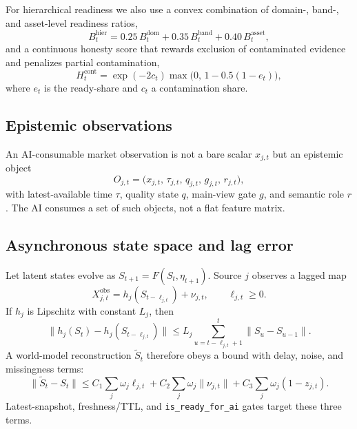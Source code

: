 \documentclass[12pt]{article}
\begin{document}
For hierarchical readiness we also use a convex combination of domain-, band-, and asset-level readiness ratios,
\begin{equation}
B^{\mathrm{hier}}_t=0.25\,B^{\mathrm{dom}}_t+0.35\,B^{\mathrm{band}}_t+0.40\,B^{\mathrm{asset}}_t,
\label{eq:bhier}
\end{equation}
and a continuous honesty score that rewards exclusion of contaminated evidence and penalizes partial contamination,
\begin{equation}
H^{\mathrm{cont}}_t=\exp(-2c_t)\max\!\bigl(0,\,1-0.5(1-e_t)\bigr),
\label{eq:hcont}
\end{equation}
where $e_t$ is the ready-share and $c_t$ a contamination share.

\subsection{Epistemic observations}
An AI-consumable market observation is not a bare scalar $x_{j,t}$ but an epistemic object
\begin{equation}
O_{j,t}=\bigl(x_{j,t},\,\tau_{j,t},\,q_{j,t},\,g_{j,t},\,r_{j,t}\bigr),
\label{eq:obs}
\end{equation}
with latest-available time $\tau$, quality state $q$, main-view gate $g$, and semantic role $r$. The AI consumes a set of such objects, not a flat feature matrix.

\subsection{Asynchronous state space and lag error}
Let latent states evolve as $S_{t+1}=F(S_t,\eta_{t+1})$. Source $j$ observes a lagged map
\begin{equation}
X^{\mathrm{obs}}_{j,t}=h_j(S_{t-\ell_{j,t}})+\nu_{j,t},\qquad \ell_{j,t}\ge 0.
\label{eq:lagobs}
\end{equation}
If $h_j$ is Lipschitz with constant $L_j$, then
\begin{equation}
\bigl\|h_j(S_t)-h_j(S_{t-\ell_{j,t}})\bigr\|
\le L_j\sum_{u=t-\ell_{j,t}+1}^{t}\|S_u-S_{u-1}\|.
\label{eq:lipschitz}
\end{equation}
A world-model reconstruction $\widetilde S_t$ therefore obeys a bound with delay, noise, and missingness terms:
\begin{equation}
\|\widetilde S_t-S_t\|
\le C_1\sum_j\omega_j\ell_{j,t}
+C_2\sum_j\omega_j\|\nu_{j,t}\|
+C_3\sum_j\omega_j(1-z_{j,t}).
\label{eq:recon}
\end{equation}
Latest-snapshot, freshness/TTL, and \texttt{is\_ready\_for\_ai} gates target these three terms.
\end{document}
